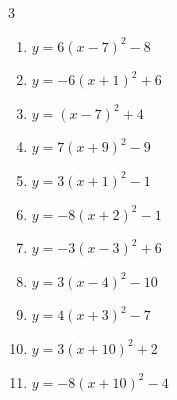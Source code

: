 \begin{multicols}{3}
\begin{enumerate}
        \phantom{$\displaystyle 頂点\left( -9 , 10 \right)$}

  \item $\displaystyle y=6\left( x-7\right)^{2}-8$

        \phantom{$\displaystyle 頂点\left( 7 , -8 \right)$}

  \item $\displaystyle y=-6\left( x+1\right)^{2}+6$

        \phantom{$\displaystyle 頂点\left( -1 , 6 \right)$}

\columnbreak %

\resetques

  \item $\displaystyle y=\left( x-7\right)^{2}+4$

        \phantom{$\displaystyle 頂点\left( 7 , 4 \right)$}

  \item $\displaystyle y=7\left( x+9\right)^{2}-9$

        \phantom{$\displaystyle 頂点\left( -9 , -9 \right)$}

  \item $\displaystyle y=3\left( x+1\right)^{2}-1$

        \phantom{$\displaystyle 頂点\left( -1 , -1 \right)$}

  \item $\displaystyle y=-8\left( x+2\right)^{2}-1$

        \phantom{$\displaystyle 頂点\left( -2 , -1 \right)$}

  \item $\displaystyle y=-3\left( x-3\right)^{2}+6$

        \phantom{$\displaystyle 頂点\left( 3 , 6 \right)$}

  \item $\displaystyle y=3\left( x-4\right)^{2}-10$

        \phantom{$\displaystyle 頂点\left( 4 , -10 \right)$}

  \item $\displaystyle y=4\left( x+3\right)^{2}-7$

        \phantom{$\displaystyle 頂点\left( -3 , -7 \right)$}

  \item $\displaystyle y=3\left( x+10\right)^{2}+2$

        \phantom{$\displaystyle 頂点\left( -10 , 2 \right)$}

  \item $\displaystyle y=-8\left( x+10\right)^{2}-4$


\end{enumerate}
\end{multicols}
